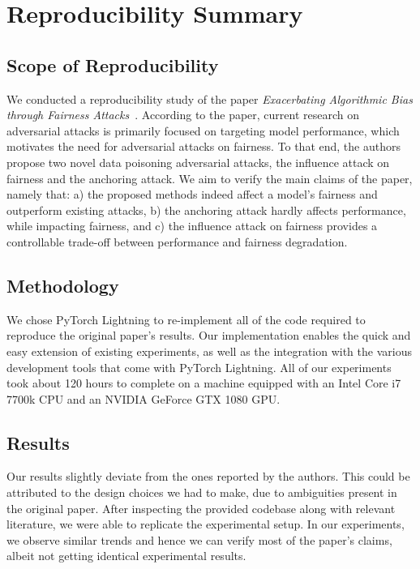 \section*{Reproducibility Summary}

\subsection*{Scope of Reproducibility}
We conducted a reproducibility study of the paper \textit{Exacerbating Algorithmic Bias through Fairness Attacks}~\cite{mehrabi2021exacerbating}. According to the paper, current research on adversarial attacks is primarily focused on targeting model performance, which motivates the need for adversarial attacks on fairness. To that end, the authors propose two novel data poisoning adversarial attacks, the influence attack on fairness and the anchoring attack. We aim to verify the main claims of the paper, namely that: a) the proposed methods indeed affect a model's fairness and outperform existing attacks, b) the anchoring attack hardly affects performance, while impacting fairness, and c) the influence attack on fairness provides a controllable trade-off between performance and fairness degradation.

\subsection*{Methodology}
We chose PyTorch Lightning to re-implement all of the code required to reproduce the original paper's results. Our implementation enables the quick and easy extension of existing experiments, as well as the integration with the various development tools that come with PyTorch Lightning. All of our experiments took about 120 hours to complete on a machine equipped with an Intel Core i7 7700k CPU and an NVIDIA GeForce GTX 1080 GPU.

\subsection*{Results}
Our results slightly deviate from the ones reported by the authors. This could be attributed to the design choices we had to make, due to ambiguities present in the original paper. After inspecting the provided codebase along with relevant literature, we were able to replicate the experimental setup. In our experiments, we observe similar trends and hence we can verify most of the paper's claims, albeit not getting identical experimental results.

